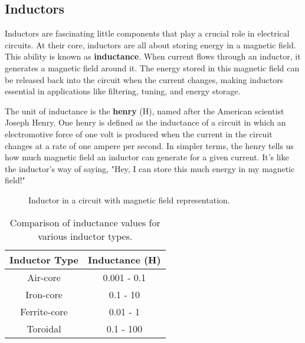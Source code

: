 \subsection{Inductors}
\label{subsec:inductors}

Inductors are fascinating little components that play a crucial role in electrical circuits. At their core, inductors are all about storing energy in a magnetic field. This ability is known as \textbf{inductance}. When current flows through an inductor, it generates a magnetic field around it. The energy stored in this magnetic field can be released back into the circuit when the current changes, making inductors essential in applications like filtering, tuning, and energy storage.

The unit of inductance is the \textbf{henry} (H), named after the American scientist Joseph Henry. One henry is defined as the inductance of a circuit in which an electromotive force of one volt is produced when the current in the circuit changes at a rate of one ampere per second. In simpler terms, the henry tells us how much magnetic field an inductor can generate for a given current. It's like the inductor's way of saying, "Hey, I can store this much energy in my magnetic field!"

\begin{figure}[h]
    \centering
    \caption{Inductor in a circuit with magnetic field representation.}
    \label{fig:inductor-circuit}
\end{figure}

\begin{table}[h]
    \centering
    \begin{tabular}{|c|c|}
        \hline
        \textbf{Inductor Type} & \textbf{Inductance (H)} \\
        \hline
        Air-core & 0.001 - 0.1 \\
        Iron-core & 0.1 - 10 \\
        Ferrite-core & 0.01 - 1 \\
        Toroidal & 0.1 - 100 \\
        \hline
    \end{tabular}
    \caption{Comparison of inductance values for various inductor types.}
    \label{tab:inductance-values}
\end{table}

